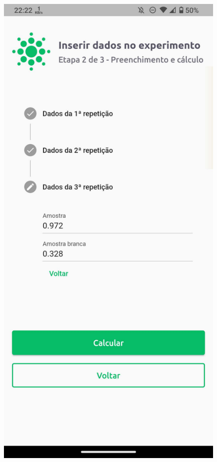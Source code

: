 \begin{figure}[p]
  \includegraphics[width=.3\textwidth]{images/enzitech/calculo_2.pdf}

  \vspace{1cm}


\end{figure}
